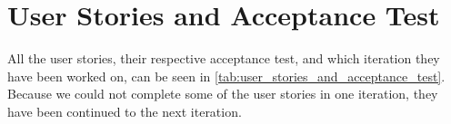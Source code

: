 
\chapter{User Stories and Acceptance Test}
\label{app:user_stories_and_acceptance_test}

All the user stories, their respective acceptance test, and which iteration they have been worked on, can be seen in \ref{tab:user_stories_and_acceptance_test}. Because we could not complete some of the user stories in one iteration, they have been continued to the next iteration.

